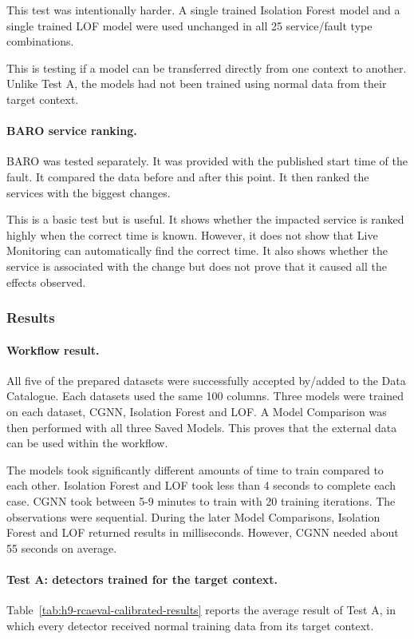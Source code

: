 This test was intentionally harder. A single trained Isolation Forest model and a single trained LOF model were used unchanged in all 25 service/fault type combinations.

This is testing if a model can be transferred directly from one context to another. Unlike Test A, the models had not been trained using normal data from their target context.

\paragraph{BARO service ranking.}

BARO was tested separately. It was provided with the published start time of the fault. It compared the data before and after this point. It then ranked the services with the biggest changes.

This is a basic test but is useful. It shows whether the impacted service is ranked highly when the correct time is known. However, it does not show that Live Monitoring can automatically find the correct time. It also shows whether the service is associated with the change but does not prove that it caused all the effects observed.

\subsubsection{Results}

\paragraph{Workflow result.}

All five of the prepared datasets were successfully accepted by/added to the Data Catalogue. Each datasets used the same 100 columns. Three models were trained on each dataset, CGNN, Isolation Forest and LOF. A Model Comparison was then performed with all three Saved Models. This proves that the external data can be used within the workflow.

The models took significantly different amounts of time to train compared to each other. Isolation Forest and LOF took less than 4 seconds to complete each case. CGNN took between 5-9 minutes to train with 20 training iterations. The observations were sequential. During the later Model Comparisons, Isolation Forest and LOF returned results in milliseconds. However, CGNN needed about 55 seconds on average.

\paragraph{Test A: detectors trained for the target context.}
Table~\ref{tab:h9-rcaeval-calibrated-results} reports the average result of Test A, in which every detector received normal training data from its target context.

